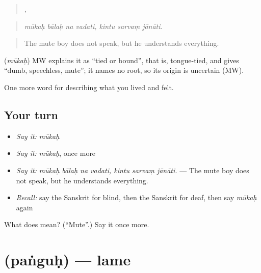 \begin{quote}
   ,   
\end{quote}

\begin{quote}
\emph{mūkaḥ bālaḥ na vadati, kintu sarvaṃ jānāti.}
\end{quote}

\begin{quote}
The mute boy does not speak, but he understands everything.
\end{quote}

\begin{cousinweb}
\textbf{} (\emph{mūkaḥ}) MW explains it as \textquotedblleft{}tied or bound\textquotedblright{}, that is, tongue-tied, and gives \textquotedblleft{}dumb, speechless, mute\textquotedblright{}; it names no root, so its origin is uncertain (MW).
\end{cousinweb}

\begin{grammarlens}[title={What you've built}]
One more word for describing what you lived and felt.
\end{grammarlens}

\subsection*{Your turn}
\begin{itemize}
\raggedright
  \item \emph{Say it:} \emph{mūkaḥ}
  \item \emph{Say it:} \emph{mūkaḥ}, once more
  \item \emph{Say it:} \emph{mūkaḥ bālaḥ na vadati, kintu sarvaṃ jānāti.} — The mute boy does not speak, but he understands everything.
  \item \emph{Recall:} say the Sanskrit for blind, then the Sanskrit for deaf, then say \emph{mūkaḥ} again
\end{itemize}

\begin{tcolorbox}[breakable,colback=teal!4,colframe=teal!35!black,title={Before you move on}]
What does  mean? (\textquotedblleft{}Mute\textquotedblright{}.) Say it once more.
\end{tcolorbox}
\section[\texorpdfstring{\sk{पंगुः} (paṅguḥ)}{पंगुः (paṅguḥ)}]{ (paṅguḥ) — lame}

